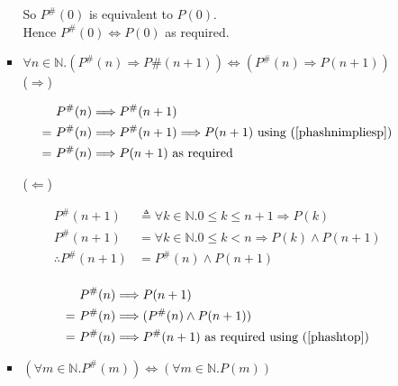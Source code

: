\documentclass[10pt,\jkfside,a4paper]{article}
\begin{document}
\begin{enumerate}
\begin{enumerate}
\begin{itemize}
So $P^\#(0)$ is equivalent to $P(0)$.\\
Hence $P^\#(0) \Longleftrightarrow P(0)$ as required.

\item $\forall n \in \mathbb{N}. (P^\#(n) \Longrightarrow P\#(n+1)) 
\Longleftrightarrow (P^\#(n) \Longrightarrow P(n+1))$\\

($\Longrightarrow$)

\begin{equation}
\begin{split}
&\text{ } P^\#(n) \Longrightarrow P^\#(n + 1)\\
=&\text{ } P^\#(n) \Longrightarrow P^\#(n + 1)\Longrightarrow P(n + 1)\text{ using (\ref{phashnimpliesp})}\\
=&\text{ } P^\#(n) \Longrightarrow P(n+1) \text{ as required}\\
\end{split}
\end{equation}

($\Longleftarrow$)

\begin{center}
\begin{equation}\label{phashtop}
\begin{split}
P^\#(n+1)&\triangleq \forall k \in \mathbb{N}. 0 \leqslant k \leqslant n+1 \Longrightarrow P(k)\\
P^\#(n+1)&= \forall k \in \mathbb{N}. 0 \leqslant k < n \Longrightarrow P(k) \wedge P(n+1)\\
\therefore P^\#(n + 1) &= P^\#(n) \wedge P(n + 1)\\
\end{split}
\end{equation}

\begin{equation}
\begin{split}
& \text{ }P^\#(n) \Longrightarrow P(n+1)\\
=& \text{ }P^\#(n) \Longrightarrow (P^\#(n) \wedge P(n+1))\\
=& \text{ }P^\#(n) \Longrightarrow P^\#(n + 1)\text{ as required using (\ref{phashtop})}\\
\end{split}
\end{equation}
\end{center}

\item $(\forall m \in \mathbb{N}. P^\#(m))\Longleftrightarrow (\forall m  \in\mathbb{N}.P(m))$


\end{itemize}
\end{enumerate}
\end{enumerate}
\end{document}

